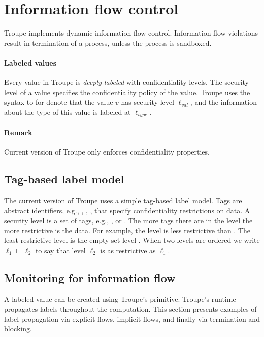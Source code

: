 \section{Information flow control}
\label{sec:infoflow}
Troupe implements dynamic information flow control. 
%
Information flow violations result in termination of a process,
unless the process is sandboxed. 

\paragraph{Labeled values}
Every value in Troupe is \emph{deeply labeled} with confidentiality
levels. The security level of 
a value specifies the confidentiality policy of the 
value. Troupe uses the syntax  to 
for denote that the value $\mathit{v}$ has security level 
$\mathit{\ell_{\mathit{val}}}$, and the information about the type of this value is labeled at $\mathit{\ell_{\mathit{type}}}$.






\paragraph{Remark}
Current version of Troupe only enforces confidentiality 
properties.

\subsection{Tag-based label model}
The current version of Troupe uses a simple tag-based label model.
Tags are abstract identifiers, e.g., , , ,
that specify confidentiality restrictions on data. 
A security level is a set of tags, e.g., 
, or 
.
The more tags there are in the level the more restrictive is the data. 
For example, the level 
 is less restrictive than 
. The least restrictive level is the 
empty set level \lev{}. When two levels are ordered we write 
$\ell_1 \sqsubseteq \ell_2$ to say that level $\ell_2$ is as restrictive 
as $\ell_1$.



\subsection{Monitoring for information flow}
A labeled value can be created using Troupe's 
primitive. Troupe's runtime propagates labels throughout the computation.
This section presents examples of label propagation via explicit flows, implicit flows, and
finally via termination and blocking.


